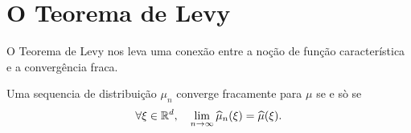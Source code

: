 %
%






\section{O Teorema de Levy}

O Teorema de Levy nos leva uma conexão entre a noção de função característica e a convergência fraca.


\begin{theorem}
 Uma sequencia de distribuição $\mu_n$ converge fracamente para $\mu$ se e sò se
 \begin{equation}
  \forall \xi \in {\ensuremath{\mathbb R}}^d, \quad \lim_{n\to \infty}\widehat \mu_n(\xi)=\widehat \mu(\xi).
 \end{equation}
\end{theorem}


